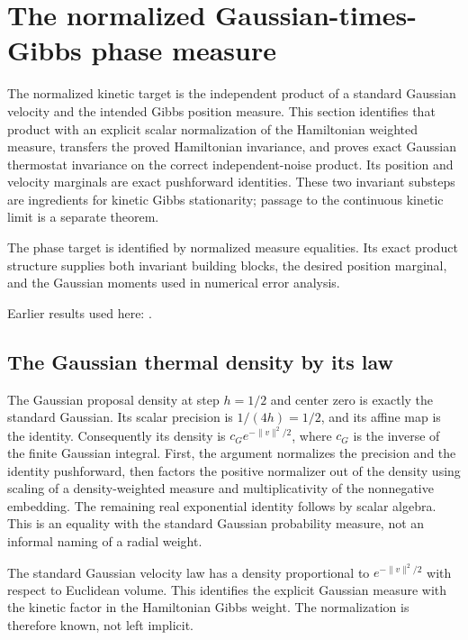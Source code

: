 \documentclass[11pt,a4paper]{report}
\begin{document}
\section{\texorpdfstring{The normalized Gaussian-times-Gibbs phase measure}{The normalized Gaussian-times-Gibbs phase measure}}
\label{proof-module-KineticLangevin-GibbsTarget-lean}


The normalized kinetic target is the independent product of a standard Gaussian velocity and the intended Gibbs position measure. This section identifies that product with an explicit scalar normalization of the Hamiltonian weighted measure, transfers the proved Hamiltonian invariance, and proves exact Gaussian thermostat invariance on the correct independent-noise product. Its position and velocity marginals are exact pushforward identities. These two invariant substeps are ingredients for kinetic Gibbs stationarity; passage to the continuous kinetic limit is a separate theorem.



The phase target is identified by normalized measure equalities. Its exact product structure supplies both invariant building blocks, the desired position marginal, and the Gaussian moments used in numerical error analysis.



Earlier results used here: \cite[Section~3.37]{LangevinLean2026ULASC}.
\subsection{\texorpdfstring{The Gaussian thermal density by its law}{The Gaussian thermal density by its law}}
\label{report-step-KineticLangevin-GibbsTarget-lean-1}


The Gaussian proposal density at step \(h=1/2\) and center zero is exactly the standard Gaussian. Its scalar precision is \(1/(4h)=1/2\), and its affine map is the identity. Consequently its density is \(c_Ge^{-\|v\|^2/2}\), where \(c_G\) is the inverse of the finite Gaussian integral. First, the argument normalizes the precision and the identity pushforward, then factors the positive normalizer out of the density using scaling of a density-weighted measure and multiplicativity of the nonnegative embedding. The remaining real exponential identity follows by scalar algebra. This is an equality with the standard Gaussian probability measure, not an informal naming of a radial weight.



The standard Gaussian velocity law has a density proportional to \(e^{-\|v\|^2/2}\) with respect to Euclidean volume. This identifies the explicit Gaussian measure with the kinetic factor in the Hamiltonian Gibbs weight. The normalization is therefore known, not left implicit.
\end{document}
